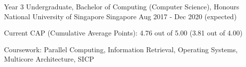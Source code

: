 

\begin{cventries}

  \cventry
  {Year 3 Undergraduate, Bachelor of Computing (Computer Science), Honours} %
  {National University of Singapore} %
  {Singapore} %
  {Aug 2017 - Dec 2020 (expected)} %
  {
    \begin{cvitems} %
      \item {Current CAP (Cumulative Average Points): 4.76 out of 5.00 (3.81 out of 4.00)}
      \item {Coursework: Parallel Computing, Information Retrieval, Operating Systems, Multicore Architecture, SICP}
    \end{cvitems}
  }




\end{cventries}
